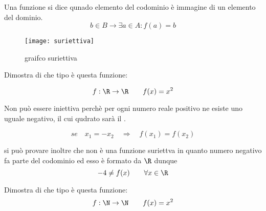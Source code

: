 \documentclass[../appunti.tex]{subfiles}
\begin{document}
\begin{defn} Una funzione si dice  qunado  elemento del codominio è immagine di  un elemento del dominio.
\begin{equation}
  b\in B \rightarrow \exists a \in A : f(a) = b
\end{equation}

\begin{figure}[ht]
	\center
	\texttt{[image: suriettiva]}
	\label{fig:grafico_suriettiva}
	\caption{graifco suriettiva}
\end{figure}
\end{defn}


\begin{eser}
Dimostra di che tipo è questa funzione:\vspace{1.5mm}

\begin{equation}
  f :\R\rightarrow \R \qquad f(x)=x^2
\end{equation}

\end{eser}

\begin{dimo}
Non può essere iniettiva perchè per ogni numero reale positivo ne esiste uno uguale negativo, il cui qudrato sarà il .\vspace{1.5mm}

\begin{equation}
  se\quad x_1 = -x_2 \quad \Rightarrow \quad f(x_1) = f(x_2)
\end{equation}  

\vspace{2mm}
si può provare inoltre che non è una funzione suriettva in quanto  numero negativo fa parte del codominio ed esso è formato da $\R$ dunque
\begin{equation}
  -4 \ne f(x) \qquad \forall x \in \R
\end{equation}
\end{dimo}

\begin{eser}
Dimostra di che tipo è questa funzione:
\begin{equation}
  f :\N\rightarrow \N \qquad f(x)=x^2
\end{equation}
\end{eser}
\end{document}
